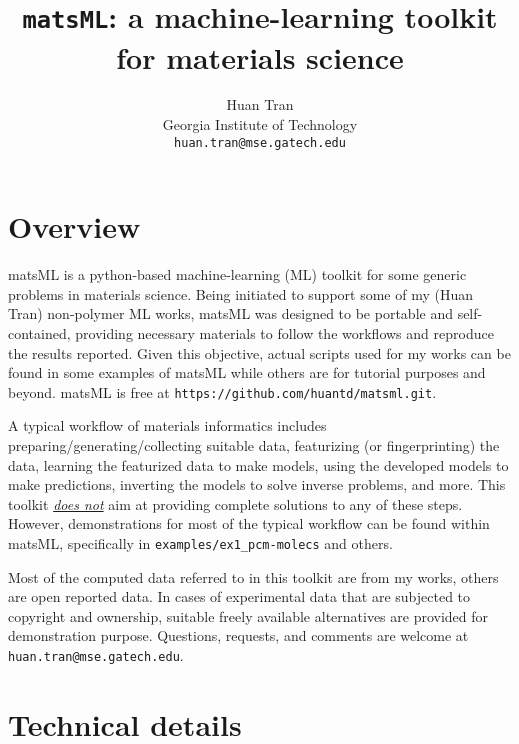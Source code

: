 \documentclass[12pt]{article}
\begin{document}
\title{\LARGE \texttt{matsML}: a machine-learning toolkit for materials science}
\author{{Huan Tran}\\ 
	{Georgia Institute of Technology}\\
\texttt{huan.tran@mse.gatech.edu}}

\maketitle
\tableofcontents

\section{Overview}
matsML is a python-based machine-learning (ML) toolkit for some generic problems in materials science. Being initiated to support some of my (Huan Tran) non-polymer ML works, matsML was designed to be portable and self-contained, providing necessary materials to follow the workflows and reproduce the results reported. Given this objective, actual scripts used for my works can be found in some examples of matsML while others are for tutorial purposes and beyond. matsML is free at \texttt{https://github.com/huantd/matsml.git}.

A typical workflow of materials informatics includes preparing/generating/collecting suitable data, featurizing (or fingerprinting) the data, learning the featurized data to make models, using the developed models to make predictions, inverting the models to solve inverse problems, and more. This toolkit \underline{\it does not} aim at providing complete solutions to any of these steps. However, demonstrations for most of the typical workflow can be found within matsML, specifically in \texttt{examples/ex1\_pcm-molecs} and others. 

Most of the computed data referred to in this toolkit are from my works, others are open reported data. In cases of experimental data that are subjected to copyright and ownership, suitable freely available alternatives are provided for demonstration purpose. Questions, requests, and comments are welcome at \texttt{huan.tran@mse.gatech.edu}.

\section{Technical details}
\end{document}
